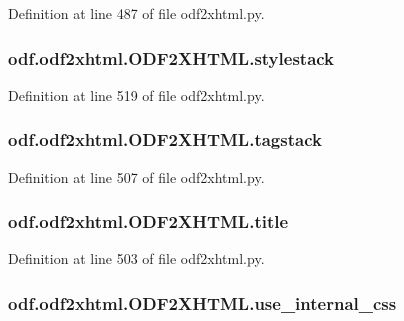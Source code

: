 Definition at line 487 of file odf2xhtml.\+py.

\hypertarget{classodf_1_1odf2xhtml_1_1ODF2XHTML_aa4517811274efe365e06423e6481f6f0}{
\subsubsection[{stylestack}]{\setlength{\rightskip}{0pt plus 5cm}odf.\+odf2xhtml.\+O\+D\+F2\+X\+H\+T\+M\+L.\+stylestack}}\label{classodf_1_1odf2xhtml_1_1ODF2XHTML_aa4517811274efe365e06423e6481f6f0}


Definition at line 519 of file odf2xhtml.\+py.

\hypertarget{classodf_1_1odf2xhtml_1_1ODF2XHTML_a982a04827cdc62e08e0eef40b5436cc9}{
\subsubsection[{tagstack}]{\setlength{\rightskip}{0pt plus 5cm}odf.\+odf2xhtml.\+O\+D\+F2\+X\+H\+T\+M\+L.\+tagstack}}\label{classodf_1_1odf2xhtml_1_1ODF2XHTML_a982a04827cdc62e08e0eef40b5436cc9}


Definition at line 507 of file odf2xhtml.\+py.

\hypertarget{classodf_1_1odf2xhtml_1_1ODF2XHTML_ac02b24b23d0701d3ee157c15bdabd93d}{
\subsubsection[{title}]{\setlength{\rightskip}{0pt plus 5cm}odf.\+odf2xhtml.\+O\+D\+F2\+X\+H\+T\+M\+L.\+title}}\label{classodf_1_1odf2xhtml_1_1ODF2XHTML_ac02b24b23d0701d3ee157c15bdabd93d}


Definition at line 503 of file odf2xhtml.\+py.

\hypertarget{classodf_1_1odf2xhtml_1_1ODF2XHTML_a3cffe38f14e08fd6dd0605caee6b20a2}{
\subsubsection[{use\+\_\+internal\+\_\+css}]{\setlength{\rightskip}{0pt plus 5cm}odf.\+odf2xhtml.\+O\+D\+F2\+X\+H\+T\+M\+L.\+use\+\_\+internal\+\_\+css}}\label{classodf_1_1odf2xhtml_1_1ODF2XHTML_a3cffe38f14e08fd6dd0605caee6b20a2}


